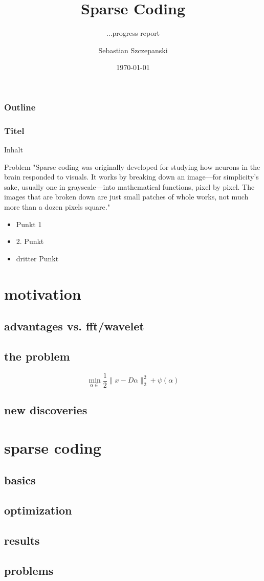 




\title{Sparse Coding}
\subtitle{...progress report}
\author{Sebastian Szczepanski}
\date{\today}

\begin{frame}
\titlepage
\end{frame}

\begin{frame}
\frametitle{Outline}
\tableofcontents[part=1,pausesections]
\end{frame}

\begin{frame}
\frametitle{Titel}
Inhalt
\begin{block}{Problem}
"Sparse coding was originally developed for studying how neurons in the brain responded to visuals. It works by breaking down an image—for simplicity's sake, usually one in grayscale—into mathematical functions, pixel by pixel. The images that are broken down are just small patches of whole works, not much more than a dozen pixels square."
\end{block}
\begin{itemize}
\item Punkt 1
\item 2. Punkt
\item dritter Punkt
\end{itemize}
\end{frame}
\section{motivation}
\subsection{advantages vs. fft/wavelet}
\subsection{the problem}
\begin{frame}
\[ 
\min_{\alpha\in} \frac{1}{2} \lVert x - D\alpha \rVert^{2}_{2} + \psi(\alpha)
\] 
\end{frame}
\subsection{new discoveries}
\section{sparse coding}
\subsection{basics}
\subsection{optimization}
\subsection{results}
\subsection{problems}

